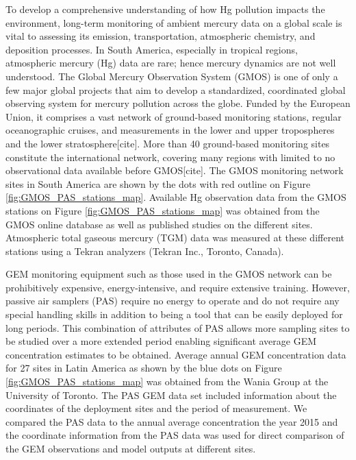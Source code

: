 \begin{flushleft}
To develop a comprehensive understanding of how Hg pollution impacts the environment, long-term monitoring of ambient mercury data on a global scale is vital to assessing its emission, transportation, atmospheric chemistry, and deposition processes. In South America, especially in tropical regions, atmospheric mercury (Hg) data are rare; hence mercury dynamics are not well understood. The Global Mercury Observation System (GMOS) is one of only a few major global projects that aim to develop a standardized, coordinated global observing system for mercury pollution across the globe. Funded by the European Union, it comprises a vast network of ground-based monitoring stations, regular oceanographic cruises, and measurements in the lower and upper tropospheres and the lower stratosphere[cite]. More than 40 ground-based monitoring sites constitute the international network, covering many regions with limited to no observational data available before GMOS[cite]. The GMOS monitoring network sites in South America are shown by the dots with red outline on Figure \ref{fig:GMOS_PAS_stations_map}. Available Hg observation data from the GMOS stations on Figure  \ref{fig:GMOS_PAS_stations_map} was obtained from the GMOS online database as well as published studies on the different sites. Atmospheric total gaseous mercury (TGM) data was  measured at these different stations using a Tekran analyzers (Tekran Inc., Toronto, Canada).

GEM monitoring equipment such as those used in the GMOS network can be prohibitively expensive, energy-intensive, and require extensive training. However, passive air samplers (PAS) require no energy to operate and do not require any special handling skills in addition to being a tool that can be easily deployed for long periods. This combination of attributes of PAS allows more sampling sites to be studied over a more extended period enabling significant average GEM concentration estimates to be obtained. Average annual GEM concentration data for 27 sites in Latin America as shown by the blue dots on Figure  \ref{fig:GMOS_PAS_stations_map} was obtained from the Wania Group at the University of Toronto. The PAS GEM data set included information about the coordinates of the deployment sites and the period of measurement. We compared the PAS data to the annual average concentration the year 2015 and the coordinate information from the PAS data was used for direct comparison of the GEM observations and model outputs at different sites.
\end{flushleft}

